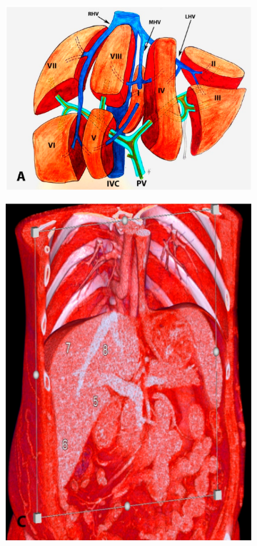 \begin{figure}[H]
	\centering
	\begin{subfigure}[t]{0.25\textwidth}
		\centering
		\includegraphics[width=\textwidth]{assets/figure_a.png} %
		\caption{}
		\label{fig:figure-a}
	\end{subfigure}
	\hfill
	\begin{subfigure}[t]{0.25\textwidth}
		\centering
		\includegraphics[width=\textwidth]{assets/figure_c.png} %

\end{subfigure}
\end{figure}
